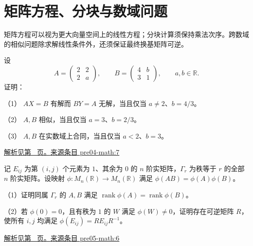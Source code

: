 \documentclass[12pt,fontset=fandol]{ctexart}
\begin{document}
\section{矩阵方程、分块与数域问题}

\label{sec:questions-9}

矩阵方程可以视为更大向量空间上的线性方程；分块计算须保持乘法次序。跨数域的相似问题除求解线性条件外，还须保证最终换基矩阵可逆。

\begin{example}\label{ex:pre04-math:7}

设
\[
A=\begin{pmatrix}2&2\\2&a\end{pmatrix},\qquad
B=\begin{pmatrix}4&b\\3&1\end{pmatrix},
\qquad a,b\in\mathbb R.
\]
证明：

（1） $AX=B$ 有解而 $BY=A$ 无解，当且仅当 $a\ne2$、$b=4/3$。

（2） $A,B$ 相似，当且仅当 $a=3$、$b=2/3$。

（3） $A,B$ 在实数域上合同，当且仅当 $a<2$、$b=3$。

\par\hyperref[ans:pre04-math:7]{解析见第~\pageref{ans:pre04-math:7} 页。}\quad\href{https://github.com/lzxcr/cmc-mathematics/blob/64916fa1fdbc3e444a652eca204d5669058ee321/src/problems/preliminary/04/07.md}{来源条目 pre04-math:7}

\end{example}

\begin{example}\label{ex:pre05-math:6}

记 $E_{ij}$ 为第 $(i,j)$ 个元素为 $1$、其余为 $0$ 的 $n$ 阶实矩阵，$\Gamma_r$ 为秩等于 $r$ 的全部 $n$ 阶实矩阵。设映射 $\phi:M_n(\mathbb R)\to M_n(\mathbb R)$ 满足 $\phi(AB)=\phi(A)\phi(B)$。

（1）证明同属 $\Gamma_r$ 的 $A,B$ 满足 $\operatorname{rank}\phi(A)=\operatorname{rank}\phi(B)$。

（2）若 $\phi(0)=0$，且有秩为 $1$ 的 $W$ 满足 $\phi(W)\ne0$，证明存在可逆矩阵 $R$，使所有 $i,j$ 均满足 $\phi(E_{ij})=RE_{ij}R^{-1}$。

\par\hyperref[ans:pre05-math:6]{解析见第~\pageref{ans:pre05-math:6} 页。}\quad\href{https://github.com/lzxcr/cmc-mathematics/blob/64916fa1fdbc3e444a652eca204d5669058ee321/src/problems/preliminary/05/06.md}{来源条目 pre05-math:6}

\end{example}
\end{document}
